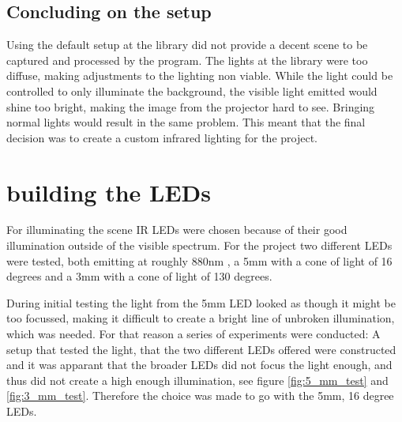 \subsection{Concluding on the setup}
Using the default setup at the library did not provide a decent scene to be captured and processed by the program. The lights at the library were too diffuse, making adjustments to the lighting non viable. While the light could be controlled to only illuminate the background, the visible light emitted would shine too bright, making the image from the projector hard to see. Bringing normal lights would result in the same problem. This meant that the final decision was to create a custom infrared lighting for the project.



\section{building the LEDs}
For illuminating the scene IR LEDs were chosen because of their good illumination outside of the visible spectrum. For the project two different LEDs were tested, both emitting at roughly 880nm \citep{5mm_led} \citep{3mm_led}, a 5mm with a cone of light of 16 degrees and a 3mm with a cone of light of 130 degrees.

During initial testing the light from the 5mm LED looked as though it might be too focussed, making it difficult to create a bright line of unbroken illumination, which was needed. For that reason a series of experiments were conducted: A setup that tested the light, that the two different LEDs offered were constructed and it was apparant that the broader LEDs did not focus the light enough, and thus did not create a high enough illumination, see figure \ref{fig:5_mm_test} and \ref{fig:3_mm_test}. Therefore the choice was made to go with the 5mm, 16 degree LEDs.

